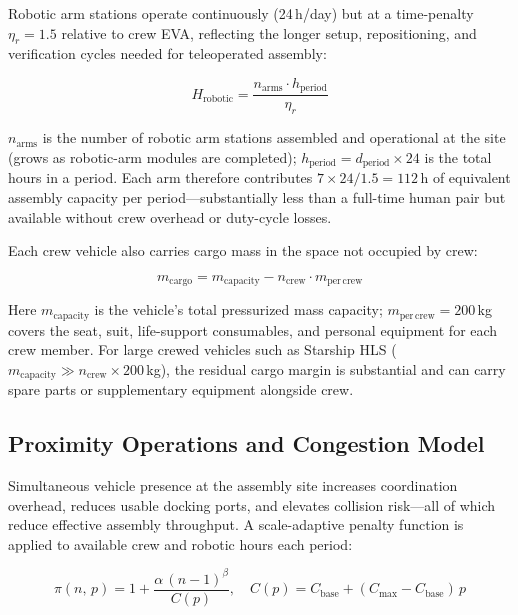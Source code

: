 Robotic arm stations operate continuously (24\,h/day) but at a
time-penalty $\eta_r = 1.5$ relative to crew EVA, reflecting the
longer setup, repositioning, and verification cycles needed for
teleoperated assembly:

\begin{equation}
  H_{\mathrm{robotic}} = \frac{n_{\mathrm{arms}} \cdot h_{\mathrm{period}}}{\eta_r}
\end{equation}

\noindent $n_{\mathrm{arms}}$ is the number of robotic arm stations
assembled and operational at the site (grows as robotic-arm modules
are completed); $h_{\mathrm{period}} = d_{\mathrm{period}} \times 24$
is the total hours in a period.
Each arm therefore contributes $7 \times 24 / 1.5 = 112$\,h of
equivalent assembly capacity per period---substantially less than
a full-time human pair but available without crew overhead or
duty-cycle losses.

Each crew vehicle also carries cargo mass in the space not occupied
by crew:

\begin{equation}
  m_{\mathrm{cargo}} = m_{\mathrm{capacity}}
                       - n_{\mathrm{crew}} \cdot m_{\mathrm{per\,crew}}
\end{equation}

\noindent Here $m_{\mathrm{capacity}}$ is the vehicle's total
pressurized mass capacity; $m_{\mathrm{per\,crew}} = 200$\,kg
covers the seat, suit, life-support consumables, and personal
equipment for each crew member.
For large crewed vehicles such as Starship HLS ($m_{\mathrm{capacity}}
\gg n_{\mathrm{crew}} \times 200$\,kg), the residual cargo margin
is substantial and can carry spare parts or supplementary equipment
alongside crew.

\subsection{Proximity Operations and Congestion Model}

Simultaneous vehicle presence at the assembly site increases
coordination overhead, reduces usable docking ports, and elevates
collision risk---all of which reduce effective assembly throughput.
A scale-adaptive penalty function is applied to available crew
and robotic hours each period:

\begin{equation}
  \pi(n,\,p) = 1 + \frac{\alpha\,(n-1)^{\beta}}{C(p)}, \quad
  C(p) = C_{\mathrm{base}} + (C_{\mathrm{max}} - C_{\mathrm{base}})\,p
  \label{eq:penalty}
\end{equation}

